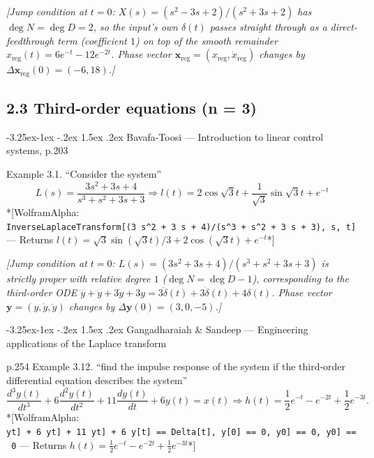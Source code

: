 \documentclass[
  11pt,
]{article}
\makeatletter
\providecommand{\implies}{\Longrightarrow}
\renewcommand\paragraph{\@startsection{paragraph}{4}{\z@}%
                                     {-3.25ex\@plus -1ex \@minus -.2ex}%
                                     {1.5ex \@plus .2ex}%
                                     {\normalfont\normalsize\bfseries}}
\makeatother
\begin{document}
\emph{{[}Jump condition at \(t=0\): \(X(s)=(s^2-3s+2)/(s^2+3s+2)\) has
\(\deg N=\deg D=2\), so the input's own \(\delta(t)\) passes straight
through as a direct-feedthrough term (coefficient \(1\)) on top of the
smooth remainder \(x_{\text{reg}}(t)=6e^{-t}-12e^{-2t}\). Phase vector
\(\mathbf x_{\text{reg}}=(x_{\text{reg}},\dot x_{\text{reg}})\) changes
by \(\Delta\mathbf x_{\text{reg}}(0)=(-6,18)\).{]}}

\hypertarget{third-order-equations}{%
\subsection{2.3 Third-order equations (n =
3)}\label{third-order-equations}}

\hypertarget{bavafa-toosi-introduction-to-linear-control-systems-p.203}{%
\paragraph{Bavafa-Toosi --- Introduction to linear control systems,
p.203}\label{bavafa-toosi-introduction-to-linear-control-systems-p.203}}

Example 3.1. ``Consider the system'' \[
L(s) = \frac{3s^2 + 3s + 4}{s^3 + s^2 + 3s + 3} \implies l(t) = 2\cos\sqrt{3}t + \frac{1}{\sqrt{3}}\sin\sqrt{3}t + e^{-t}
\] *{[}WolframAlpha:
\texttt{InverseLaplaceTransform{[}(3\ s\^{}2\ +\ 3\ s\ +\ 4)/(s\^{}3\ +\ s\^{}2\ +\ 3\ s\ +\ 3),\ s,\ t{]}}
--- Returns
\(l(t) = \sqrt{3}\sin(\sqrt{3}t)/3 + 2\cos(\sqrt{3}t) + e^{-t}\)*{]}

\emph{{[}Jump condition at \(t=0\): \(L(s)=(3s^2+3s+4)/(s^3+s^2+3s+3)\)
is strictly proper with relative degree \(1\) (\(\deg N=\deg D-1\)),
corresponding to the third-order ODE
\(\dddot y+\ddot y+3\dot y+3y=3\ddot\delta(t)+3\dot\delta(t)+4\delta(t)\).
Phase vector \(\mathbf y=(y,\dot y,\ddot y)\) changes by
\(\Delta\mathbf y(0)=(3,0,-5)\).{]}}

\hypertarget{gangadharaiah-sandeep-engineering-applications-of-the-laplace-transform}{%
\paragraph{Gangadharaiah \& Sandeep --- Engineering applications of the
Laplace
transform}\label{gangadharaiah-sandeep-engineering-applications-of-the-laplace-transform}}

p.254 Example 3.12. ``find the impulse response of the system if the
third-order differential equation describes the system'' \[
\frac{d^3 y(t)}{dt^3} + 6 \frac{d^2 y(t)}{dt^2} + 11 \frac{dy(t)}{dt} + 6y(t) = x(t) \implies h(t) = \frac{1}{2} e^{-t} - e^{-2t} + \frac{1}{2} e^{-3t}.
\] *{[}WolframAlpha:
\texttt{y\textquotesingle{}\textquotesingle{}\textquotesingle{}{[}t{]}\ +\ 6\ y\textquotesingle{}\textquotesingle{}{[}t{]}\ +\ 11\ y\textquotesingle{}{[}t{]}\ +\ 6\ y{[}t{]}\ ==\ Delta{[}t{]},\ y{[}0{]}\ ==\ 0,\ y\textquotesingle{}{[}0{]}\ ==\ 0,\ y\textquotesingle{}\textquotesingle{}{[}0{]}\ ==\ 0}
--- Returns
\(h(t) = \frac{1}{2} e^{-t} - e^{-2t} + \frac{1}{2} e^{-3t}\)*{]}
\end{document}
